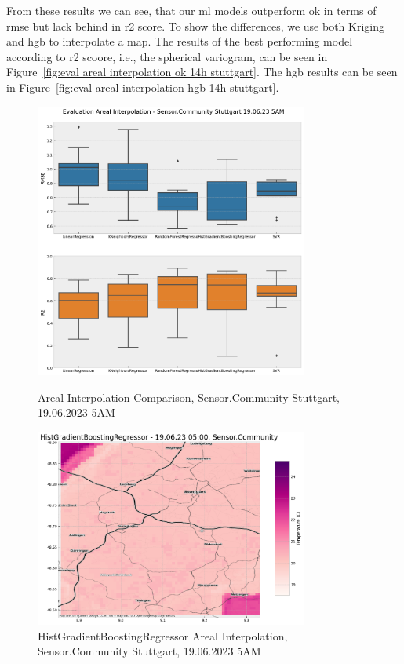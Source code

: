 From these results we can see, that our \gls{ml} models outperform \gls{ok} in terms of \gls{rmse} but lack behind in \gls{r2} score. To show the differences, we use both Kriging and \gls{hgb} to interpolate a map. The results of the best performing model according to \gls{r2} scoore, i.e., the spherical variogram, can be seen in Figure~\ref{fig:eval areal interpolation ok 14h stuttgart}. The \gls{hgb} results can be seen in Figure~\ref{fig:eval areal interpolation hgb 14h stuttgart}.\\

\begin{figure}[htp]
    \centering
    \includegraphics[width=0.8\textwidth]{images/eval areal interpolation 19.06.2023 5h.png}
    \caption{Areal Interpolation Comparison, Sensor.Community Stuttgart, 19.06.2023 5AM}
    \label{fig:eval areal interpolation 5h stuttgart}

    \includegraphics[width=0.8\textwidth]{images/eval areal interpolation hgb 5h.png}
    \caption{HistGradientBoostingRegressor Areal Interpolation, Sensor.Community Stuttgart, 19.06.2023 5AM}
    \label{fig:eval areal interpolation 5h stuttgart map}
\end{figure}

